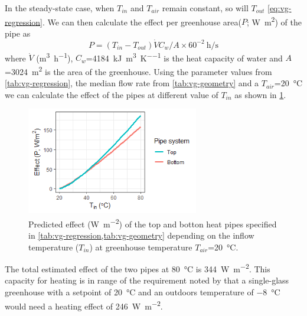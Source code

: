 In the steady-state case, when $T_{in}$ and $T_{air}$ remain constant, so will $T_{out}$ \eqref{eq:vg-regression}. We can then calculate the effect per greenhouse area($P$; \si{\watt\square\meter}) of the pipe as
\begin{equation}
  P = (T_{in} - T_{out})\dot{V}C_w/A\times 60^{-2}\:\si{\hour\per\second}
\end{equation}
where $\dot{V}$ (\si{\cubic\meter\per\hour}), $C_w$=\SI{4184}{\kilo\joule\per\cubic\meter\per\kelvin} is the heat capacity of water and $A$=\SI{3024}{\square\meter} is the area of the greenhouse. Using the parameter values from \cref{tab:vg-regression}, the median flow rate from \cref{tab:vg-geometry} and a $T_{air}$=\SI{20}{\celsius} we can calculate the effect of the pipes at different value of $T_{in}$ as shown in \cref{fig:vg-heat-pipe-effect}.

\begin{figure} [ht]
\centering
\includegraphics[width=0.67\textwidth]{graphics/vg/heat-pipe-effect.png}
\caption{Predicted effect (\si{\watt\per\square\meter}) of the top and botton heat pipes specified in \cref{tab:vg-regression,tab:vg-geometry} depending on the inflow temperature ($T_{in}$) at greenhouse temperature $T_{air}$=\SI{20}{\celsius}.}
\label{fig:vg-heat-pipe-effect}
\end{figure}

The total estimated effect of the two pipes at \SI{80}{\celsius} is \SI{344}{\watt\per\square\meter}. This capacity for heating is in range of the requirement noted by 
\citet{Braak95} that a single-glass greenhouse with a setpoint of \SI{20}{\celsius} and an outdoors temperature of \SI{-8}{\celsius} would need a heating effect of \SI{246}{\watt\per\square\meter}.
